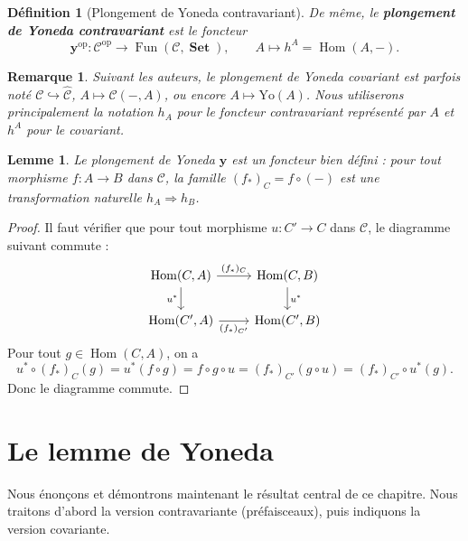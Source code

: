 \documentclass[a4paper,12pt]{book}
\DeclareMathOperator{\Hom}{Hom}
\DeclareMathOperator{\Fun}{Fun}
\DeclareMathOperator{\Set}{\mathbf{Set}}
\newcommand{\op}{\mathrm{op}}
\newtheorem{lemme}[theoreme]{Lemme}
\newtheorem{definition}[theoreme]{Définition}
\newtheorem*{remarque}{Remarque}
\begin{document}
\begin{definition}[Plongement de Yoneda contravariant]\label{def:plongement-yoneda-contrav}
De même, le \textbf{plongement de Yoneda contravariant} est le foncteur
\[
    \mathbf{y}^{\op} \colon \mathcal{C}^{\op} \longrightarrow
    \Fun(\mathcal{C}, \Set), \qquad
    A \longmapsto h^A = \Hom(A, -).
\]
\end{definition}

\begin{remarque}\label{rem:yoneda-notations}
Suivant les auteurs, le plongement de Yoneda covariant est parfois noté
$\mathcal{C} \hookrightarrow \widehat{\mathcal{C}}$,
$A \mapsto \mathcal{C}(-, A)$, ou encore $A \mapsto \mathrm{Yo}(A)$.
Nous utiliserons principalement la notation $h_A$ pour le foncteur
contravariant représenté par $A$ et $h^A$ pour le covariant.
\end{remarque}

\begin{lemme}\label{lem:y-bien-defini}
Le plongement de Yoneda $\mathbf{y}$ est un foncteur bien défini :
pour tout morphisme $f \colon A \to B$ dans $\mathcal{C}$,
la famille $(f_*)_C = f \circ (-)$ est une transformation naturelle
$h_A \Rightarrow h_B$.
\end{lemme}

\begin{proof}
Il faut vérifier que pour tout morphisme $u \colon C' \to C$ dans $\mathcal{C}$,
le diagramme suivant commute :
\[
\begin{tikzcd}
\Hom(C, A) \arrow[r, "(f_*)_C"] \arrow[d, "u^*"'] &
\Hom(C, B) \arrow[d, "u^*"] \\
\Hom(C', A) \arrow[r, "(f_*)_{C'}"'] &
\Hom(C', B)
\end{tikzcd}
\]
Pour tout $g \in \Hom(C, A)$, on a
\[
    u^* \circ (f_*)_C(g) = u^*(f \circ g) = f \circ g \circ u
    = (f_*)_{C'}(g \circ u) = (f_*)_{C'} \circ u^*(g).
\]
Donc le diagramme commute.
\end{proof}


\section{Le lemme de Yoneda}\label{sec:lemme-yoneda}

Nous énonçons et démontrons maintenant le résultat central de ce chapitre.
Nous traitons d'abord la version contravariante (préfaisceaux), puis
indiquons la version covariante.
\end{document}
